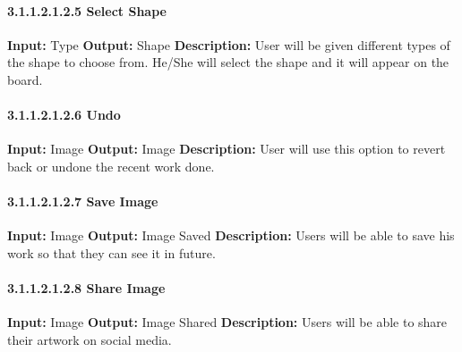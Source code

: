 \documentclass{scrreprt}
\begin{document}
\paragraph{3.1.1.2.1.2.5 Select Shape}
\hfill \vspace{2.5mm} \break 
\textbf{Input:} Type \newline
\textbf{Output:} Shape
\vspace{1mm}\newline
\textbf{Description:} \newline 
User will be given different types of the shape to choose from. He/She will select the shape and it will appear on the board.

\paragraph{3.1.1.2.1.2.6 Undo}
\hfill \vspace{2.5mm} \break 
\textbf{Input:} Image \newline
\textbf{Output:} Image
\vspace{1mm}\newline
\textbf{Description:} \newline 
User will use this option to revert back or undone the recent work done.

\paragraph{3.1.1.2.1.2.7 Save Image}
\hfill \vspace{2.5mm} \break 
\textbf{Input:} Image \newline
\textbf{Output:} Image Saved
\vspace{1mm}\newline
\textbf{Description:} \newline 
Users will be able to save his work so that they can see it in future.

\paragraph{3.1.1.2.1.2.8 Share Image}
\hfill \vspace{2.5mm} \break 
\textbf{Input:} Image \newline
\textbf{Output:} Image Shared
\vspace{1mm}\newline
\textbf{Description:} \newline
Users will be able to share their artwork on social media.
\end{document}
